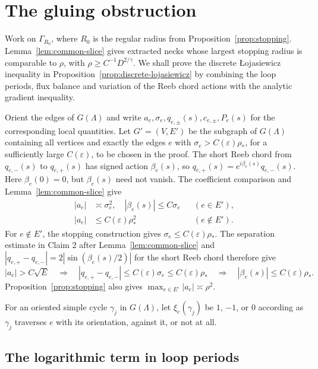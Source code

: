 \documentclass[11pt,a4paper]{article}
\numberwithin{equation}{section}
\theoremstyle{definition}
\theoremstyle{remark}
\begin{document}
	
	\section{The gluing obstruction}\label{sect:gluing-obstruction}
	
	Work on $\Gamma_{R_0}$, where $R_0$ is the regular radius from
	Proposition~\ref{prop:stopping}.
	Lemma~\ref{lem:common-slice} gives extracted necks whose
	largest stopping radius is comparable to $\rho$, with
	$\rho\ge C^{-1}D^{2/\gamma}$.
	We shall prove the discrete \L{}ojasiewicz inequality in
	Proposition~\ref{prop:discrete-lojasiewicz} by combining the loop periods,
	flux balance and variation of the Reeb chord actions with the analytic
	gradient inequality.
	
	Orient the edges of $G(\Lambda)$ and write
	$a_e,\sigma_e,q_{e,\pm}(s),c_{e,\pm},P_e(s)$ for the corresponding
	local quantities. Let $G'=(V,E')$ be the subgraph of $G(\Lambda)$
	containing all vertices and exactly the edges $e$ with $\sigma_e>C(\varepsilon)\rho_*$,
	for a sufficiently large $C(\varepsilon)$, to be chosen in the proof.
	The short Reeb chord from $q_{e,-}(s)$ to $q_{e,+}(s)$ has signed action
	$\beta_e(s)$, so $q_{e,+}(s)=e^{i\beta_e(s)}q_{e,-}(s)$.
	Here $\beta_e(0)=0$, but $\beta_e(s)$ need not vanish.
	The coefficient comparison and Lemma~\ref{lem:common-slice} give
	\[
	\begin{aligned}
		|a_e|&\asymp\sigma_e^2,\quad |\beta_e(s)|\le C\sigma_e
		&&(e\in E'),\\
		|a_e|&\le C(\varepsilon)\rho_*^2 &&(e\notin E').
	\end{aligned}
	\]
	For $e\notin E'$, the stopping construction gives
	$\sigma_e\le C(\varepsilon)\rho_*$.
	The separation estimate in Claim 2 after Lemma~\ref{lem:common-slice}
	and $|q_{e,+}-q_{e,-}|=2|\sin(\beta_e(s)/2)|$ for the short Reeb chord
	therefore give
	\begin{equation}\label{eqn:small-edge-action}
		|a_e|>C\sqrt E
		\quad\Longrightarrow\quad
		|q_{e,+}-q_{e,-}|\le C(\varepsilon)\sigma_e\le C(\varepsilon)\rho_*
		\quad\Longrightarrow\quad |\beta_e(s)|\le C(\varepsilon)\rho_*.
	\end{equation}
	Proposition~\ref{prop:stopping} also gives
	$\max_{e\in E'}|a_e|\asymp\rho^2$.
	
	For an oriented simple cycle $\gamma_j$ in $G(\Lambda)$, let
	$\xi_e(\gamma_j)$ be $1$, $-1$, or $0$ according as $\gamma_j$ traverses
	$e$ with its orientation, against it, or not at all.
	
	\subsection{The logarithmic term in loop periods}
	\label{sect:logarithmic-loop-periods}
	
\end{document}
